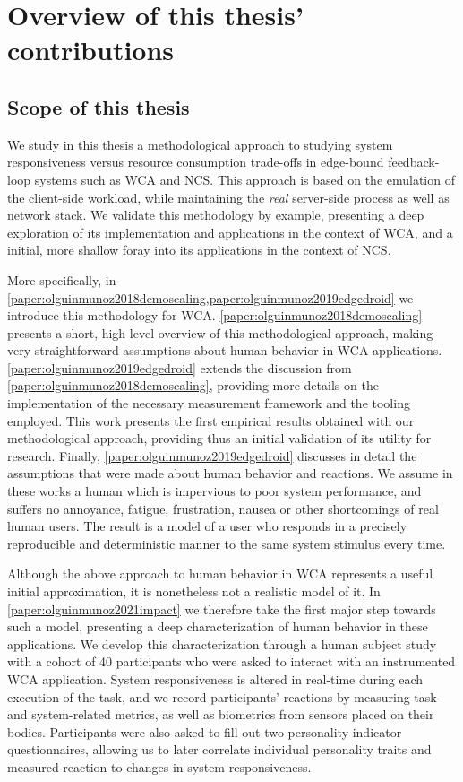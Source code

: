 \chapter{Overview of this thesis' contributions}


\section{Scope of this thesis}

We study in this thesis a methodological approach to studying system responsiveness versus resource consumption trade-offs in edge-bound feedback-loop systems such as \ac{WCA} and \ac{NCS}.
This approach is based on the emulation of the client-side workload, while maintaining the \emph{real} server-side process as well as network stack.
We validate this methodology by example, presenting a deep exploration of its implementation and applications in the context of \acl{WCA}, and a initial, more shallow foray into its applications in the context of \ac{NCS}.

More specifically, in \cref{paper:olguinmunoz2018demoscaling,paper:olguinmunoz2019edgedroid} we introduce this methodology for \ac{WCA}.
\cref{paper:olguinmunoz2018demoscaling} presents a short, high level overview of this methodological approach, making very straightforward assumptions about human behavior in \ac{WCA} applications.
\cref{paper:olguinmunoz2019edgedroid} extends the discussion from \cref{paper:olguinmunoz2018demoscaling}, providing more details on the implementation of the necessary measurement framework and the tooling employed.
This work presents the first empirical results obtained with our methodological approach, providing thus an initial validation of its utility for research.
Finally, \cref{paper:olguinmunoz2019edgedroid} discusses in detail the assumptions that were made about human behavior and reactions.
We assume in these works a human which is impervious to poor system performance, and suffers no annoyance, fatigue, frustration, nausea or other shortcomings of real human users.
The result is a model of a user who responds in a precisely reproducible and deterministic manner to the same system stimulus every time.

Although the above approach to human behavior in \ac{WCA} represents a useful initial approximation, it is nonetheless not a realistic model of it.
In \cref{paper:olguinmunoz2021impact} we therefore take the first major step towards such a model, presenting a deep characterization of human behavior in these applications.
We develop this characterization through a human subject study with a cohort of \num{40} participants who were asked to interact with an instrumented \ac{WCA} application.
System responsiveness is altered in real-time during each execution of the task, and we record participants' reactions by measuring task- and system-related metrics, as well as biometrics from sensors placed on their bodies.
Participants were also asked to fill out two personality indicator questionnaires, allowing us to later correlate individual personality traits and measured reaction to changes in system responsiveness.

